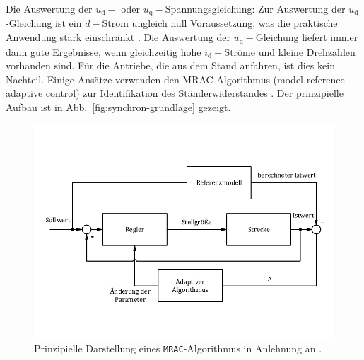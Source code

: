 \documentclass[conference,twocolumn]{IEEEtran}
\newcommand{\x}[1]{\mathrm{#1}}
\begin{document}
Die Auswertung der $u_\x{d}-$ oder $u_\x{q}-$Spannungsgleichung: Zur Auswertung der $u_\x{d}$-Gleichung ist ein $d-$Strom ungleich null Voraussetzung, was die praktische Anwendung stark einschränkt \autocite{Kellner2012}.
Die Auswertung der $u_\x{q}-$Gleichung liefert immer dann gute Ergebnisse, wenn gleichzeitig hohe $i_\x{d}-$Ströme und kleine Drehzahlen vorhanden sind.
Für die Antriebe, die aus dem Stand anfahren, ist dies kein Nachteil.
Einige Ansätze verwenden den MRAC-Algorithmus (model-reference adaptive control) zur Identifikation des Ständerwiderstandes \autocite{slotine_applied_1991}.
Der prinzipielle Aufbau ist in Abb.~\ref{fig:synchron-grundlage} gezeigt.

\begin{figure}[h!]
\centering
\includegraphics[width=\columnwidth]{img/mrac}
\caption{Prinzipielle Darstellung eines \texttt{MRAC}-Algorithmus in Anlehnung an \textcite{slotine_applied_1991}.}
\label{fig:mrac}
\end{figure}
\end{document}
